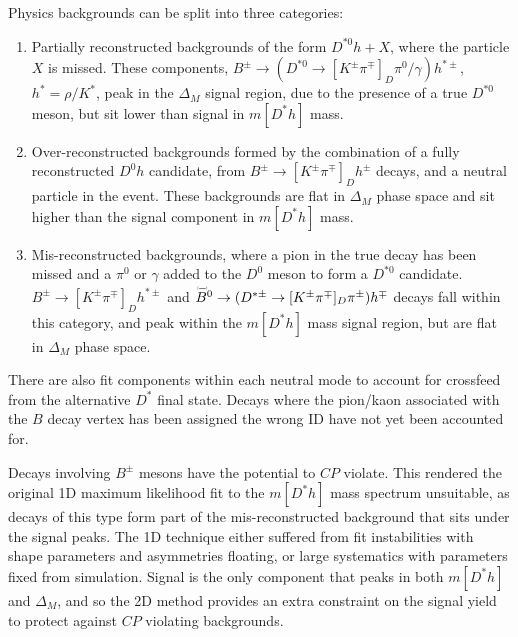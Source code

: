 \documentclass[oneside,12pt]{article}
\newcommand\brobor{\smash[b]{\raisebox{0.6\height}{\scalebox{0.5}{\tiny(}}{\mkern-1.5mu\scriptstyle-\mkern-1.5mu}\raisebox{0.6\height}{\scalebox{0.5}{\tiny)}}}}
\begin{document}
Physics backgrounds can be split into three categories:
\begin{enumerate}
	\item Partially reconstructed backgrounds of the form $D^{*0}h+X$, where the
particle $X$ is missed. These components, $B^{\pm}\rightarrow
(D^{*0}\rightarrow [K^{\pm}\pi^{\mp}]_D \pi^0/\gamma)h^{*\pm}$, $h^*=\rho/K^*$,
peak in the $\Delta_M$ signal region, due to the presence of a true $D^{*0}$
meson, but sit lower than signal in $m[D^*h]$ mass.
  \item Over-reconstructed backgrounds formed by the combination of a fully
	reconstructed $D^0h$ candidate, from $B^{\pm}\rightarrow
[K^{\pm}\pi^{\mp}]_Dh^{\pm}$ decays, and a neutral particle in the event.
These backgrounds are flat in $\Delta_M$ phase space and sit higher than the
signal component in $m[D^*h]$ mass.
  \item Mis-reconstructed backgrounds, where a pion in the true decay has been missed and
  a $\pi^0$ or $\gamma$ added to the $D^0$ meson to form a $D^{*0}$ candidate.
  $B^{\pm}\rightarrow [K^{\pm}\pi^{\mp}]_Dh^{*\pm}$ and
  $\accentset{\brobor}{B}\phantom{}^{0}\rightarrow (D^{*\pm}\rightarrow
  [K^{\pm}\pi^{\mp}]_D \pi^{\pm})h^{\mp}$ decays fall within this category, and
  peak within the $m[D^*h]$ mass signal region, but are flat in $\Delta_M$ phase
  space.
\end{enumerate}

There are also fit components within each neutral mode to account for
crossfeed from the alternative $D^*$ final state. Decays where the pion/kaon
associated with the $B$ decay vertex has been assigned the wrong ID have not yet
been accounted for.

Decays involving $B^{\pm}$ mesons have the potential to $CP$ violate. This
rendered the original 1D maximum likelihood fit to the $m[D^*h]$ mass spectrum
unsuitable, as decays of this type form part of the mis-reconstructed
background that sits under the signal peaks. The 1D technique either suffered
from fit instabilities with shape parameters and asymmetries floating, or large
systematics with parameters fixed from simulation. Signal is the only component
that peaks in both $m[D^*h]$ and $\Delta_M$, and so the 2D method provides an
extra constraint on the signal yield to protect against $CP$ violating
backgrounds.
\end{document}
